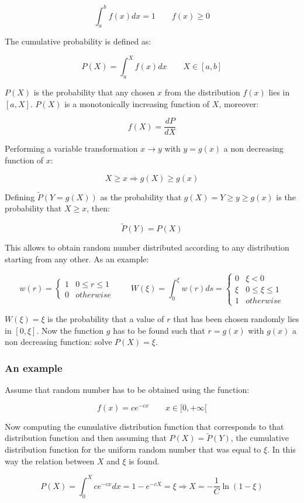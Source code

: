 	$$\int_a^bf(x)dx = 1\qquad f(x)\ge 0$$

	The cumulative probability is defined as:

	$$P(X) = \int_a^X f(x)dx\qquad X\in[a,b]$$

	$P(X)$ is the probability that any chosen $x$ from the distribution $f(x)$ lies in $[a, X]$.
	$P(X)$ is a monotonically increasing function of $X$, moreover:

	$$f(X) = \frac{dP}{dX}$$

	Performing a variable transformation $x\rightarrow y$ with $y = g(x)$ a non decreasing function of $x$:

	$$X\ge x \Rightarrow g(X) \ge g(x)$$

	Defining $\tilde{P}(Y=g(X))$ as the probability that $g(X)=Y\ge y\ge g(x)$ is the probability that $X\ge x$, then:

	$$\tilde{P}(Y) = P(X)$$

	This allows to obtain random number distributed according to any distribution starting from any other.
	As an example:

	$$w(r) = \begin{cases}1 &0\le r\le 1\\0 &otherwise\end{cases}\qquad W(\xi) = \int_0^\xi w(r)ds = \begin{cases}0 & \xi<0\\\xi & 0\le\xi\le1\\1 &otherwise\end{cases}$$

	$W(\xi) = \xi$ is the probability that a value of $r$ that has been chosen randomly lies in $[0, \xi]$.
	Now the function $g$ has to be found such that $r = g(x)$ with $g(x)$ a non decreasing function: solve $P(X) = \xi$.

		\subsubsection{An example}
		Assume that random number has to be obtained using the function:

		$$f(x) = ce^{-cx}\qquad x\in[0, +\infty[$$

		Now computing the cumulative distribution function that corresponds to that distribution function and then assuming that $P(X) = \tilde{P}(Y)$, the cumulative distribution function for the uniform random number that was equal to $\xi$.
		In this way the relation between $X$ and $\xi$ is found.

		$$P(X) = \int_0^Xce^{-cx}dx = 1- e^{-cX} = \xi\Rightarrow X = -\frac{1}{C}\ln(1-\xi)$$

